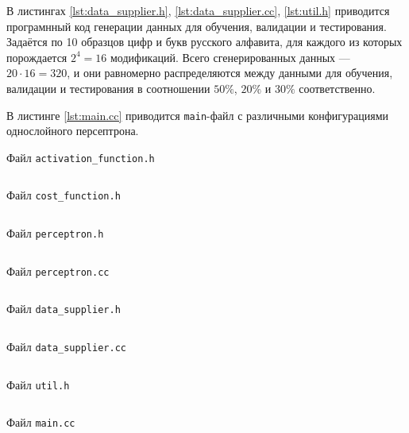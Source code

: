 \documentclass[a4paper, 14pt]{extarticle}
\newenvironment{longlisting}{\captionsetup{type=listing}}{}
\begin{document}
В листингах \ref{lst:data_supplier.h}, \ref{lst:data_supplier.cc}, \ref{lst:util.h} приводится програмнный код генерации данных для обучения,
валидации и тестирования. Задаётся по 10 образцов цифр и букв русского алфавита, для каждого из которых порождается $2^4 = 16$ модификаций. 
Всего сгенерированных данных --- $20 \cdot 16 = 320$, и они равномерно распределяются между данными для обучения, валидации и тестирования в соотношении
$50\%$, $20\%$ и $30\%$ соответственно.

В листинге \ref{lst:main.cc} приводится \texttt{main}-файл с различными конфигурациями однослойного персептрона.

\begin{longlisting}
  \caption{Файл \texttt{activation\_function.h}}
  \inputminted{cpp}{../src/activation_function.h}
  \label{lst:activation_function.h}
\end{longlisting}

\begin{longlisting}
  \caption{Файл \texttt{cost\_function.h}}
  \inputminted{cpp}{../src/cost_function.h}
  \label{lst:cost_function.h}
\end{longlisting}

\begin{longlisting}
  \caption{Файл \texttt{perceptron.h}}
  \inputminted{cpp}{../src/perceptron.h}
  \label{lst:perceptron.h}
\end{longlisting}

\begin{longlisting}
  \caption{Файл \texttt{perceptron.cc}}
  \inputminted{cpp}{../src/perceptron.cc}
  \label{lst:perceptron.cc}
\end{longlisting}

\begin{longlisting}
  \caption{Файл \texttt{data\_supplier.h}}
  \inputminted{cpp}{../src/data_supplier.h}
  \label{lst:data_supplier.h}
\end{longlisting}

\begin{longlisting}
  \caption{Файл \texttt{data\_supplier.cc}}
  \inputminted{cpp}{../src/data_supplier.cc}
  \label{lst:data_supplier.cc}
\end{longlisting}

\begin{longlisting}
  \caption{Файл \texttt{util.h}}
  \inputminted{cpp}{../src/util.h}
  \label{lst:util.h}
\end{longlisting}

\begin{longlisting}
  \caption{Файл \texttt{main.cc}}
  \inputminted{cpp}{../src/main.cc}
  \label{lst:main.cc}
\end{longlisting}
\end{document}
